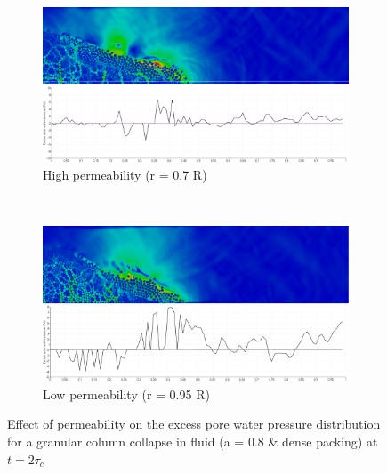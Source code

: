 \begin{figure}
\centering
\begin{subfigure}[t]{0.975\textwidth}
	\centering
    \includegraphics[width=\textwidth]{a08/r07_PWP_flow_dense}
    \caption{High permeability (r = 0.7 R)}
    \label{fig:r07_PWP_flow_dense}
\end{subfigure}
\\
\begin{subfigure}[t]{0.975\textwidth}
	\centering
    \includegraphics[width=\textwidth]{a08/r095_PWP_flow_dense}
    \caption{Low permeability (r = 0.95 R)}
    \label{fig:r095_PWP_flow_dense}
\end{subfigure}
\caption{Effect of permeability on the excess pore water pressure distribution 
for a granular column collapse in fluid (a = 0.8 \& dense packing) at $t = 
2\tau_c$}
\label{fig:PWP_flow_dense}
\end{figure}

